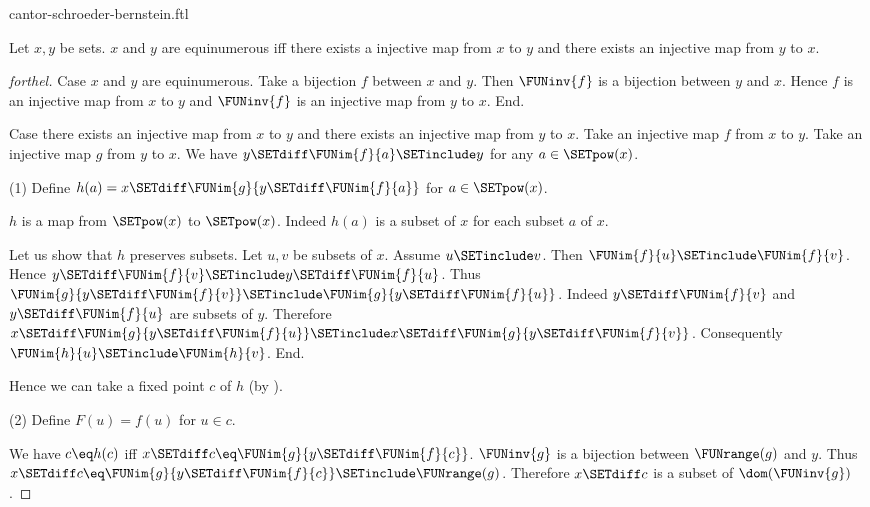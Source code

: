 \documentclass{naproche-library}
\begin{document}
\begin{smodule}[title=The Cantor-Schröder-Bernstein Theorem]{cantor-schroeder-bernstein.ftl}

\begin{theorem}[forthel,title=Cantor-Schröder-Bernstein,id=cantor_schroeder_bernstein]
  Let $x,y$ be sets.
  $x$ and $y$ are equinumerous iff there exists a injective map from $x$ to $y$ and there exists an injective map from $y$ to $x$.
\end{theorem}
\begin{proof}[forthel]
  Case $x$ and $y$ are equinumerous.
    Take a bijection $f$ between $x$ and $y$.
    Then $\FUNinv{f}$ is a bijection between $y$ and $x$.
    Hence $f$ is an injective map from $x$ to $y$ and $\FUNinv{f}$ is an
    injective map from $y$ to $x$.
  End.

  Case there exists an injective map from $x$ to $y$ and there exists an injective map from $y$ to $x$.
    Take an injective map $f$ from $x$ to $y$.
    Take an injective map $g$ from $y$ to $x$.
    We have $y \SETdiff \FUNim{f}{a} \SETinclude y$ for any $a \in \SETpow(x)$.

    (1) Define $h(a) = x \SETdiff \FUNim{g}{y \SETdiff \FUNim{f}{a}}$ for $a \in \SETpow(x)$.

    $h$ is a map from $\SETpow(x)$ to $\SETpow(x)$.
    Indeed $h(a)$ is a subset of $x$ for each subset $a$ of $x$.

    Let us show that $h$ preserves subsets.
      Let $u, v$ be subsets of $x$.
      Assume $u \SETinclude v$.
      Then $\FUNim{f}{u} \SETinclude \FUNim{f}{v}$.
      Hence $y \SETdiff \FUNim{f}{v} \SETinclude y \SETdiff \FUNim{f}{u}$.
      Thus $\FUNim{g}{y \SETdiff \FUNim{f}{v}} \SETinclude \FUNim{g}{y \SETdiff \FUNim{f}{u}}$.
      Indeed $y \SETdiff \FUNim{f}{v}$ and $y \SETdiff \FUNim{f}{u}$ are subsets of $y$.
      Therefore $x \SETdiff \FUNim{g}{y \SETdiff \FUNim{f}{u}} \SETinclude x \SETdiff \FUNim{g}{y \SETdiff \FUNim{f}{v}}$.
      Consequently $\FUNim{h}{u} \SETinclude \FUNim{h}{v}$.
    End.

    Hence we can take a fixed point $c$ of $h$ (by ).

    (2) Define $F(u) = f(u)$ for $u \in c$.

    We have $c \eq h(c)$ iff $x \SETdiff c \eq \FUNim{g}{y \SETdiff \FUNim{f}{c}}$.
    $\FUNinv{g}$ is a bijection between $\FUNrange(g)$ and $y$.
    Thus $x \SETdiff c \eq \FUNim{g}{y \SETdiff \FUNim{f}{c}} \SETinclude \FUNrange(g)$.
    Therefore $x \SETdiff c$ is a subset of $\dom(\FUNinv{g})$.


\end{proof}
\end{smodule}
\end{document}
